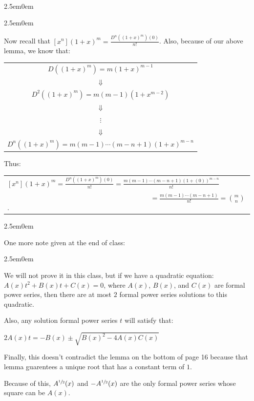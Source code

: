 \documentclass{book}
\newcommand{\teachComment}{
   \color{Orange}%
   \fontsize{12}{14}\selectfont%
}
\newenvironment{myIndent}{%
   \begin{adjustwidth}{2.5em}{0em}%
}{%
   \end{adjustwidth}%
}
\newcommand{\retTwo}{\hfill\bigbreak}
\begin{document}
\begin{myIndent}
\begin{myIndent}
      Now recall that $[x^n](1 + x)^m = \frac{D^n((1+x)^m)(0)}{n!}$.\retTwo
      Also, because of our above lemma, we know that:
      
      {\centering
      \begin{tabular}{c}
          $D((1 + x)^m) = m(1+x)^{m-1}$\\
          $\Downarrow$\\
          $D^2((1 + x)^m) = m(m-1)(1+x^{m-2})$\\
          $\Downarrow$\\
          $\vdots$\\
          $\Downarrow$\\
          $D^n((1+x)^m) = m(m-1)\cdots(m-n+1)(1 + x)^{m-n}$
      \end{tabular} \newpage\par}

      Thus: 
      
      {\centering 
      \begin{tabular}{l}
         $[x^n](1 + x)^m = \frac{D^n((1+x)^m)(0)}{n!} = \frac{m(m-1)\cdots(m-n+1)(1 + (0))^{m-n}}{n!}$\\ $\phantom{aaaaaaaaaa[x^n](1 + x)^m = \frac{D^n((1+x)^m)(0)}{n!}} = \frac{m(m-1)\cdots(m-n+1)}{n!} = \binom{m}{n}$.
      \end{tabular}\retTwo\par}
   \end{myIndent}

   
   \begin{myIndent}
      \teachComment
      One more note given at the end of class:
      \begin{myIndent}
         We will not prove it in this class, but if we have a quadratic equation:\\ $A(x)t^2 + B(x)t + C(x) = 0$, where $A(x)$, $B(x)$, and $C(x)$ are formal\\ power series, then there are at most $2$ formal power series solutions to this\\ quadratic.\retTwo
   
         Also, any solution formal power series $t$ will satisfy that:
   
         {\centering $2A(x)t = -B(x) \pm \sqrt{B(x)^2 - 4A(x)C(x)}$ \retTwo\par}
   
         Finally, this doesn't contradict the lemma on the bottom of page 16 because that lemma guarentees a unique root that has a constant term of $1$.

         Because of this, $A^{\sfrac{1}{2}}(x)$ and $-A^{\sfrac{1}{2}}(x)$ are the only formal power series whose square can be $A(x)$.
      \end{myIndent}
   \end{myIndent}
\end{myIndent}
\end{document}
